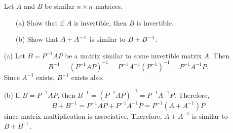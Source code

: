 \documentclass{ximera}
\begin{document}
\begin{exercise} \label{c10.3.4}
Let $A$ and $B$ be similar $n\times n$ matrices.
\begin{itemize}
\item[(a)]  Show that if $A$ is invertible, then $B$ is invertible.
\item[(b)]  Show that $A+A^{-1}$ is similar to $B+B^{-1}$.
\end{itemize}

\begin{solution}

\soln
(a) Let $B = P^{-1}AP$ be a matrix similar to some invertible matrix $A$.
Then 
\[
B^{-1} = (P^{-1}AP)^{-1} = P^{-1}A^{-1}(P^{-1})^{-1} = P^{-1}A^{-1}P.
\]
Since $A^{-1}$ exists, $B^{-1}$ exists also.

(b) If $B = P^{-1}AP$, then $B^{-1} = (P^{-1}AP)^{-1} = P^{-1}A^{-1}P$.
Therefore,
\[
B + B^{-1} = P^{-1}AP + P^{-1}A^{-1}P = P^{-1}(A + A^{-1})P
\]
since matrix multiplication is associative.  Therefore, $A + A^{-1}$ is
similar to $B + B^{-1}$.

\end{solution}
\end{exercise}
\end{document}
